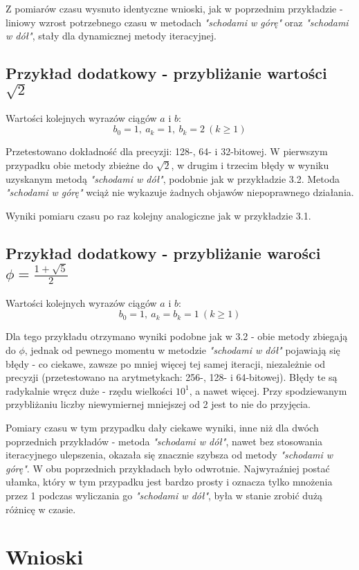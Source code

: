\documentclass{article}
\begin{document}
Z pomiarów czasu wysnuto identyczne wnioski, jak w poprzednim przykładzie - liniowy wzrost potrzebnego czasu w metodach \textit{"schodami w górę"} oraz \textit{"schodami w dół"}, stały dla dynamicznej metody iteracyjnej.

\newpage
\subsection{Przykład dodatkowy - przybliżanie wartości $\sqrt{2}$}

Wartości kolejnych wyrazów ciągów $a$ i $b$:
$$b_0=1,\ a_k=1,\ b_k=2\ (k\geq1)$$

Przetestowano dokładność dla precyzji: 128-, 64- i 32-bitowej. W pierwszym przypadku obie metody zbieżne do $\sqrt{2}$, w drugim i trzecim błędy w wyniku uzyskanym metodą \textit{"schodami w dół"}, podobnie jak w przykładzie 3.2. Metoda \textit{"schodami w górę"} wciąż nie wykazuje żadnych objawów niepoprawnego działania.

Wyniki pomiaru czasu po raz kolejny analogiczne jak w przykładzie 3.1.

\subsection{Przykład dodatkowy - przybliżanie warości $\displaystyle\phi=\frac{1+\sqrt{5}}{2}$}

Wartości kolejnych wyrazów ciągów $a$ i $b$:
$$b_0=1,\ a_k=b_k=1\ (k\geq1)$$

Dla tego przykładu otrzymano wyniki podobne jak w 3.2 - obie metody zbiegają do $\phi$, jednak od pewnego momentu w metodzie \textit{"schodami w dół"} pojawiają się błędy - co ciekawe, zawsze po mniej więcej tej samej iteracji, niezależnie od precyzji (przetestowano na arytmetykach: 256-, 128- i 64-bitowej). Błędy te są radykalnie wręcz duże - rzędu wielkości $10^1$, a nawet więcej. Przy spodziewanym przybliżaniu liczby niewymiernej mniejszej od 2 jest to nie do przyjęcia.

Pomiary czasu w tym przypadku dały ciekawe wyniki, inne niż dla dwóch poprzednich przykładów - metoda \textit{"schodami w dół"}, nawet bez stosowania iteracyjnego ulepszenia, okazała się znacznie szybsza od metody \textit{"schodami w górę"}. W obu poprzednich przykładach było odwrotnie. Najwyraźniej postać ułamka, który w tym przypadku jest bardzo prosty i oznacza tylko mnożenia przez 1 podczas wyliczania go \textit{"schodami w dół"}, była w stanie zrobić dużą różnicę w czasie.

\section{Wnioski}
\end{document}
